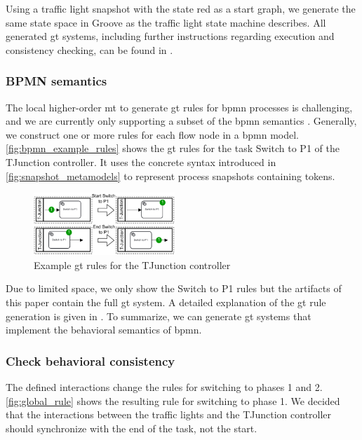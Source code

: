 \documentclass{jot}
\begin{document}
Using a traffic light snapshot with the state red as a start graph, we generate the same state space in Groove as the traffic light state machine describes.
All generated \gls*{gt} systems, including further instructions regarding execution and consistency checking, can be found in \cite{krauterArtifactsBehavioralConsistency2022}.


\subsubsection{BPMN semantics}
The local higher-order \gls*{mt} to generate \gls*{gt} rules for \gls*{bpmn} processes is challenging, and we are currently only supporting a subset of the \gls*{bpmn} semantics \cite{krauterFormalizationAnalysisBPMN2022}.
Generally, we construct one or more rules for each flow node in a \gls*{bpmn} model.
\autoref{fig:bpmn_example_rules} shows the \gls*{gt} rules for the task \textsf{Switch to P1} of the TJunction controller.
It uses the concrete syntax introduced in \cref{fig:snapshot_metamodels} to represent process snapshots containing tokens.

\begin{figure}[h]
    \centering
    \includegraphics[width=0.475\textwidth]{figures/bpmn_rules.pdf}
    \caption{Example \gls*{gt} rules for the TJunction controller}
    \label{fig:bpmn_example_rules}
\end{figure}

Due to limited space, we only show the \textsf{Switch to P1} rules but the artifacts of this paper \cite{krauterArtifactsBehavioralConsistency2022} contain the full \gls*{gt} system.
A detailed explanation of the \gls*{gt} rule generation is given in \cite{krauterFormalizationAnalysisBPMN2022}.
To summarize, we can generate \gls*{gt} systems that implement the behavioral semantics of \gls*{bpmn}.


\subsubsection{Check behavioral consistency}
The defined interactions change the rules for switching to phases 1 and 2.
\autoref{fig:global_rule} shows the resulting rule for switching to phase 1.
We decided that the interactions between the traffic lights and the TJunction controller should synchronize with the end of the task, not the start.
\end{document}
